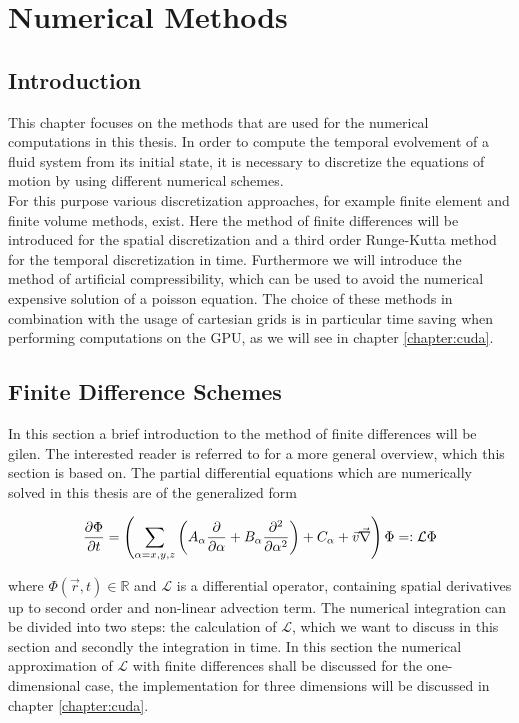 \chapter{Numerical Methods}

\section{Introduction}

This chapter focuses on the methods that are used for the numerical computations in this thesis.
In order to compute the temporal evolvement of a fluid system from its initial state, it is necessary to discretize
the equations of motion by using different numerical schemes.\\
For this purpose various discretization approaches, for example finite element and finite volume methods, exist.
Here the method of finite differences will be introduced for the spatial discretization and a third order Runge-Kutta method for the temporal discretization in time.
Furthermore we will introduce the method of artificial compressibility, which can be used to avoid the numerical expensive solution of a poisson equation.
The choice of these methods in combination with the usage of cartesian grids is in particular time saving when performing computations on the GPU, as we
will see in chapter \ref{chapter:cuda}.

\section{Finite Difference Schemes}

In this section a  brief introduction to the method of finite differences will be gilen.
The interested reader is referred to \citep{ferziger99} for a more general overview, which this section is based on.
The partial differential equations which are numerically solved in this thesis are of the generalized form

\begin{align}
    \label{numerik:pde_allg}
    \pdn[\Phi]{t} = \left(\sum_{\alpha=x,y,z}\left( A_\alpha \pdn[]{\alpha}  + B_\alpha \pdn[^2]{\alpha^2}\right) + C_\alpha +  \vec{v}\vec{\nabla} \right) \Phi =: \mathcal{L} \Phi
\end{align}

where $\Phi(\vec{r}, t)\in\mathbb{R}$ and $\mathcal{L}$ is a differential operator, containing spatial derivatives up to second order and non-linear advection term.
The numerical integration can be divided into two steps: the calculation of $\mathcal{L}$, which we want to discuss in this
section and secondly the integration in time.
In this section the numerical approximation of $\mathcal{L}$ with finite differences shall be discussed for the one-dimensional case,
the implementation for three dimensions will be discussed in chapter \ref{chapter:cuda}.

